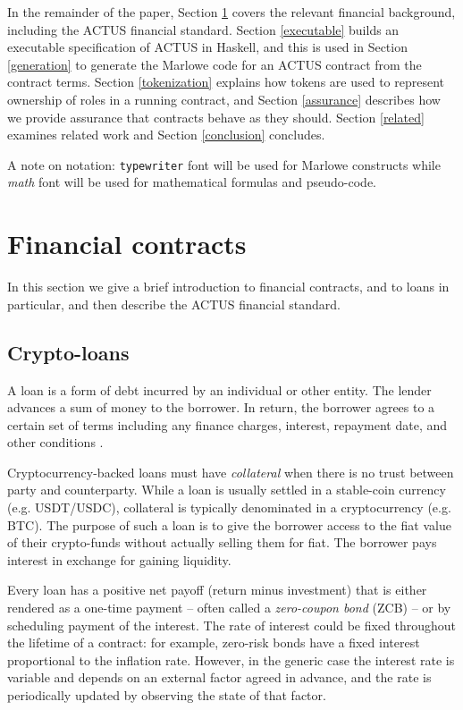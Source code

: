 \documentclass[runningheads]{llncs}
\begin{document}
In the remainder of the paper, Section \ref{background} covers the relevant financial background, including the ACTUS financial standard. Section \ref{executable} builds an executable specification of ACTUS in Haskell, and this is used in Section \ref{generation} to generate  the Marlowe code for an ACTUS contract from the contract terms. Section \ref{tokenization} explains how tokens are used to represent ownership of roles in a running contract, and Section \ref{assurance} describes how we provide assurance that  contracts behave as they should. Section \ref{related} examines related work and Section \ref{conclusion} concludes. 

A note on notation: \texttt{typewriter} font will be used for Marlowe constructs
while \emph{math} font will be used for mathematical formulas and pseudo-code.



\section{Financial contracts}
\label{background}

In this section we give a brief introduction to financial contracts, and to loans in particular, and then describe the ACTUS financial standard.

\subsection{Crypto-loans}

A loan is a form of debt incurred by an individual or other entity.
The lender advances a sum of money to the borrower. In return, the
borrower agrees to a certain set of terms including any finance charges,
interest, repayment date, and other conditions \cite{loan}.

Cryptocurrency-backed loans must have \emph{collateral} when there is no trust
between party and counterparty. While a loan is usually settled in a
stable-coin currency (e.g. USDT/USDC), collateral is typically denominated
in a cryptocurrency (e.g. BTC). The purpose of such a loan is to give
the borrower access to the fiat value of their crypto-funds without
actually selling them for fiat. The borrower pays interest in exchange
for gaining liquidity.

Every loan has a positive net payoff (return minus investment) that
is either rendered as a one-time payment -- often called a \emph{zero-coupon bond} (ZCB) -- or by scheduling
payment of the interest. The rate of interest could be fixed throughout
the lifetime of a contract: for example, zero-risk bonds have a fixed
interest proportional to the inflation rate.
However, in the generic case the interest rate is variable and depends
on an external factor agreed in advance, and the rate is periodically
updated by observing the state of that factor. 
\end{document}

